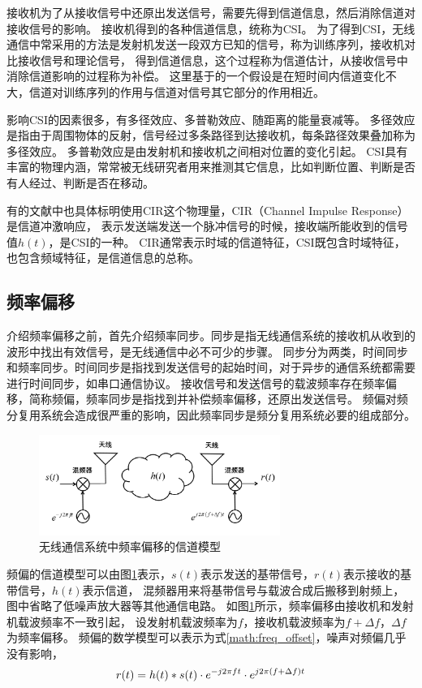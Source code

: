 		接收机为了从接收信号中还原出发送信号，需要先得到信道信息，然后消除信道对接收信号的影响。
		接收机得到的各种信道信息，统称为CSI。
		为了得到CSI，无线通信中常采用的方法是发射机发送一段双方已知的信号，称为训练序列，接收机对比接收信号和理论信号，
		得到信道信息，这个过程称为信道估计，从接收信号中消除信道影响的过程称为补偿\cite{book06commprin}。
		这里基于的一个假设是在短时间内信道变化不大，信道对训练序列的作用与信道对信号其它部分的作用相近。

		影响CSI的因素很多，有多径效应、多普勒效应、随距离的能量衰减等。
		多径效应是指由于周围物体的反射，信号经过多条路径到达接收机，每条路径效果叠加称为多径效应\cite{book06commprin}。
		多普勒效应是由发射机和接收机之间相对位置的变化引起。
		CSI具有丰富的物理内涵，常常被无线研究者用来推测其它信息，比如判断位置、判断是否有人经过、判断是否在移动。

		有的文献中也具体标明使用CIR这个物理量，CIR（Channel Impulse Response）是信道冲激响应，
		表示发送端发送一个脉冲信号的时候，接收端所能收到的信号值$h(t)$，是CSI的一种。
		CIR通常表示时域的信道特征，CSI既包含时域特征，也包含频域特征，是信道信息的总称。

		\subsection{频率偏移}
		介绍频率偏移之前，首先介绍频率同步。同步是指无线通信系统的接收机从收到的波形中找出有效信号，是无线通信中必不可少的步骤。
		同步分为两类，时间同步和频率同步。时间同步是指找到发送信号的起始时间，对于异步的通信系统都需要进行时间同步，如串口通信协议。
		接收信号和发送信号的载波频率存在频率偏移，简称频偏，频率同步是指找到并补偿频率偏移，还原出发送信号。
		频偏对频分复用系统会造成很严重的影响，因此频率同步是频分复用系统必要的组成部分。

		\begin{figure}[H]
			\centering
			\includegraphics[width=0.7\textwidth]{img/freq_offseet_channel_model.png}
			\caption{无线通信系统中频率偏移的信道模型}
			\label{fig:freq_offseet_channel_model}
		\end{figure}
		频偏的信道模型可以由图\ref{fig:freq_offseet_channel_model}表示，$s(t)$表示发送的基带信号，$r(t)$表示接收的基带信号，$h(t)$表示信道，
		混频器用来将基带信号与载波合成后搬移到射频上，图中省略了低噪声放大器等其他通信电路。
		如图\ref{fig:freq_offseet_channel_model}所示，频率偏移由接收机和发射机载波频率不一致引起，
		设发射机载波频率为$f$，接收机载波频率为$f+\Delta f$，$\Delta f$为频率偏移。
		频偏的数学模型可以表示为式\ref{math:freq_offset}，噪声对频偏几乎没有影响，
		\begin{equation}
			\centering
			r(t)=h(t)*s(t) \cdot e^{-j2\pi ft} \cdot e^{j2\pi(f+\Delta f)t}
			\label{math:freq_offset}
		\end{equation}

